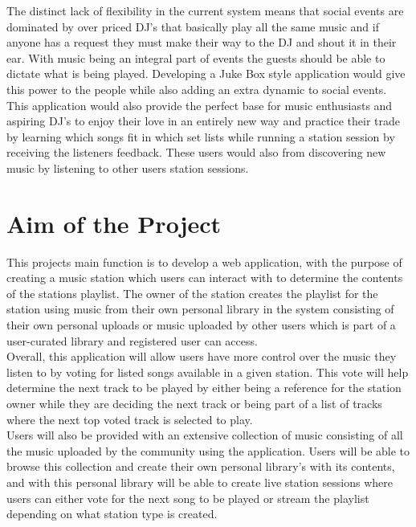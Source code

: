 \documentclass[a4paper, 12pt]{report}
\begin{document}
The distinct lack of flexibility in the current system means that social events are dominated by over priced DJ's that basically play all the same music and if anyone has a request they must make their way to the DJ and shout it in their ear. With music being an integral part of events the guests should be able to dictate what is being played. Developing a Juke Box style application would give this power to the people while also adding an extra dynamic to social events. \\

This application would also provide the perfect base for music enthusiasts and aspiring DJ's to enjoy their love in an entirely new way and practice their trade by learning which songs fit in which set lists while running a station session by receiving the listeners feedback. These users would also from discovering new music by listening to other users station sessions. 


\section{Aim of the Project}
This projects main function is to develop a web application, with the purpose of creating a music station which users can interact with to determine the contents of the stations playlist. The owner of the station creates the playlist for the station using music from their own personal library in the system consisting of their own personal uploads or music uploaded by other users which is part of a user-curated library and registered user can access.  \\

Overall, this application will allow users have more control over the music they listen to by voting for listed songs available in a given station. This vote will help determine the next track to be played by either being a reference for the station owner while they are deciding the next track or being part of a list of tracks where the next top voted track is selected to play.\\

Users will also be provided with an extensive collection of music consisting of all the music uploaded by the community using the application. Users will be able to browse this collection and create their own personal library’s with its contents, and with this personal library will be able to create live station sessions where users can either vote for the next song to be played or stream the playlist depending on what station type is created.
\end{document}
